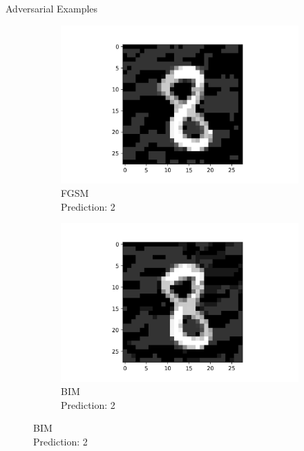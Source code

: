 \documentclass[9pt]{beamer}
\begin{document}
\begin{frame}{Adversarial Examples}
\label{adv_examples}

\begin{figure}
    \centering
    \tiny
    \begin{subfigure}[t]{0.23\linewidth}
        \centering
        \captionsetup{justification=centering}
        \includegraphics[width=\linewidth]{images/FGSM_2.png}
        \caption{FGSM\\Prediction: 2}
    \end{subfigure}
    \begin{subfigure}[t]{0.23\linewidth}
        \centering
        \captionsetup{justification=centering}
        \includegraphics[width=\linewidth]{images/BIM_2.png}
        \caption{BIM\\Prediction: 2}
    \end{subfigure}

\end{figure}
\end{frame}
\end{document}
